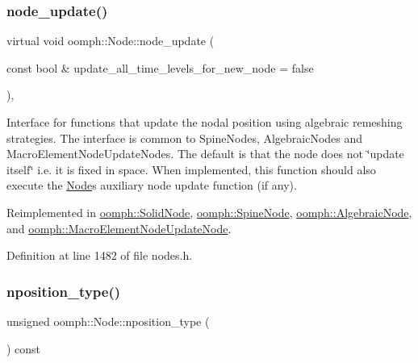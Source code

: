 \subsubsection{\texorpdfstring{node\+\_\+update()}{node\_update()}}
{\footnotesize\ttfamily virtual void oomph\+::\+Node\+::node\+\_\+update (\begin{DoxyParamCaption}\item[{const bool \&}]{update\+\_\+all\+\_\+time\+\_\+levels\+\_\+for\+\_\+new\+\_\+node = {\ttfamily false} }\end{DoxyParamCaption})\hspace{0.3cm}{\ttfamily [inline]}, {\ttfamily [virtual]}}



Interface for functions that update the nodal position using algebraic remeshing strategies. The interface is common to Spine\+Nodes, Algebraic\+Nodes and Macro\+Element\+Node\+Update\+Nodes. The default is that the node does not \char`\"{}update itself\char`\"{} i.\+e. it is fixed in space. When implemented, this function should also execute the \hyperlink{classoomph_1_1Node}{Node}\textquotesingle{}s auxiliary node update function (if any). 



Reimplemented in \hyperlink{classoomph_1_1SolidNode_ae66793af1a576edd29523ffb98b7225c}{oomph\+::\+Solid\+Node}, \hyperlink{classoomph_1_1SpineNode_afc47a59bee4ca3e42a56545afe20876d}{oomph\+::\+Spine\+Node}, \hyperlink{classoomph_1_1AlgebraicNode_a754dc8fcac3382a07f60262c9792c84c}{oomph\+::\+Algebraic\+Node}, and \hyperlink{classoomph_1_1MacroElementNodeUpdateNode_a02adaf04277672fd0e1be5296e6ed6cf}{oomph\+::\+Macro\+Element\+Node\+Update\+Node}.



Definition at line 1482 of file nodes.\+h.

\mbox{\label{classoomph_1_1Node_aee6f2b7a46fc9d875c6736895d7fc095}} 
\subsubsection{\texorpdfstring{nposition\+\_\+type()}{nposition\_type()}}
{\footnotesize\ttfamily unsigned oomph\+::\+Node\+::nposition\+\_\+type (\begin{DoxyParamCaption}{ }\end{DoxyParamCaption}) const\hspace{0.3cm}{\ttfamily [inline]}}




